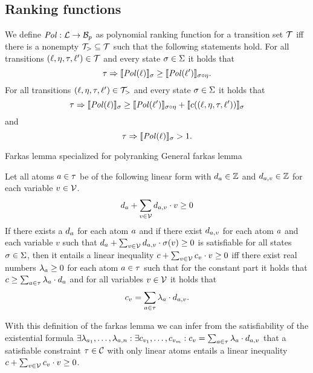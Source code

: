 \subsection{Ranking functions}

\begin{definition} 
	We define $\mathit{Pol}: \mathcal{L} \rightarrow \mathcal{B}_p$ as polynomial ranking function for a transition set $\mathcal{T}$ iff there is a nonempty $\mathcal{T}_{>} \subseteq \mathcal{T}$ such that the following statements hold.
        For all transitions $(\ell, \eta, \tau, \ell') \in \mathcal{T}$ and every state $\sigma \in \Sigma$ it holds that
	\[ \tau \Rightarrow \llbracket \mathit{Pol}(\ell) \rrbracket_{\sigma} \geq \llbracket \mathit{Pol}(\ell') \rrbracket_{\sigma \circ \eta}. \]
        For all transitions $(\ell, \eta, \tau, \ell') \in \mathcal{T}_{>}$ and every state $\sigma \in \Sigma$ it holds that        
	\[ \tau \Rightarrow \llbracket \mathit{Pol}(\ell) \rrbracket_{\sigma} \geq \llbracket \mathit{Pol}(\ell') \rrbracket_{\sigma \circ \eta} + \llbracket c((\ell, \eta, \tau, \ell')) \rrbracket_{\sigma} \]
        and
	\[ \tau \Rightarrow \llbracket \mathit{Pol}(\ell) \rrbracket_{\sigma} > 1. \]
\end{definition}




Farkas lemma specialized for polyranking \cite{bradley2005polyranking}
General farkas lemma \cite{schrijver1998theory}
\begin{definition}
  Let all atoms $a \in \tau$ be of the following linear form with $d_a \in \mathbb{Z}$ and $d_{a,v} \in \mathbb{Z}$ for each variable $v \in \mathcal{V}$.
  \[ d_a + \sum_{v \in \mathcal{V}} d_{a,v} \cdot v \geq 0 \]
  If there exists a $d_a$ for each atom $a$ and if there exist $d_{a,v}$ for each atom $a$ and each variable $v$ such that $d_a + \sum_{v \in \mathcal{V}} d_{a,v} \cdot \sigma(v) \geq 0$ is satisfiable for all states $\sigma \in \Sigma$, then it entails a linear inequality $c + \sum_{v \in \mathcal{V}} c_v \cdot v \geq 0$ iff there exist real numbers $\lambda_a \geq 0$ for each atom $a \in \tau$ such that for the constant part it holds that $c \geq \sum_{a \in \tau} \lambda_a \cdot d_a$ and for all variables $v \in \mathcal{V}$ it holds that
  \[ c_v = \sum_{a \in \tau} \lambda_a \cdot d_{a,v}. \]
\end{definition}
With this definition of the farkas lemma we can infer from the satisfiability of the existential formula $\exists \lambda_{a_1}, \dots, \lambda_{a,n}: \exists c_{v_1}, \dots, c_{v_m}: c_v = \sum_{a \in \tau} \lambda_a \cdot d_{a,v}$ that a satisfiable constraint $\tau \in \mathcal{C}$ with only linear atoms entails a linear inequality $c + \sum_{v \in \mathcal{V}} c_v \cdot v \geq 0$.
